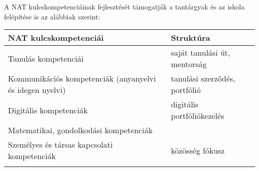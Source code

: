 A NAT kulcskompetenciáinak fejlesztését támogatják a tantárgyak és az
iskola felépítése is az alábbiak szerint:

\begin{longtable}[]{@{}ll@{}} %
\toprule
\begin{minipage}[b]{0.56\columnwidth}\raggedright
\textbf{NAT kulcskompetenciái}\strut
\end{minipage} & \begin{minipage}[b]{0.38\columnwidth}\raggedright
\textbf{Struktúra}\strut
\end{minipage}\tabularnewline
\midrule
\endhead
\begin{minipage}[t]{0.56\columnwidth}\raggedright
Tanulás kompetenciái\strut
\end{minipage} & \begin{minipage}[t]{0.38\columnwidth}\raggedright
saját tanulási út, mentorság\strut
\end{minipage}\tabularnewline
\begin{minipage}[t]{0.56\columnwidth}\raggedright
Kommunikációs kompetenciák (anyanyelvi és idegen nyelvi)\strut
\end{minipage} & \begin{minipage}[t]{0.38\columnwidth}\raggedright
tanulási szerződés, portfólió\strut
\end{minipage}\tabularnewline
\begin{minipage}[t]{0.56\columnwidth}\raggedright
Digitális kompetenciák\strut
\end{minipage} & \begin{minipage}[t]{0.38\columnwidth}\raggedright
digitális portfóliókezelés\strut
\end{minipage}\tabularnewline
\begin{minipage}[t]{0.56\columnwidth}\raggedright
Matematikai, gondolkodási kompetenciák\strut
\end{minipage} & \begin{minipage}[t]{0.38\columnwidth}\raggedright
\strut
\end{minipage}\tabularnewline
\begin{minipage}[t]{0.56\columnwidth}\raggedright
Személyes és társas kapcsolati kompetenciák\strut
\end{minipage} & \begin{minipage}[t]{0.38\columnwidth}\raggedright
közösség fókusz\strut
\end{minipage}\tabularnewline
\begin{minipage}[t]{0.56\columnwidth}\raggedright

\end{minipage}
\end{longtable}
